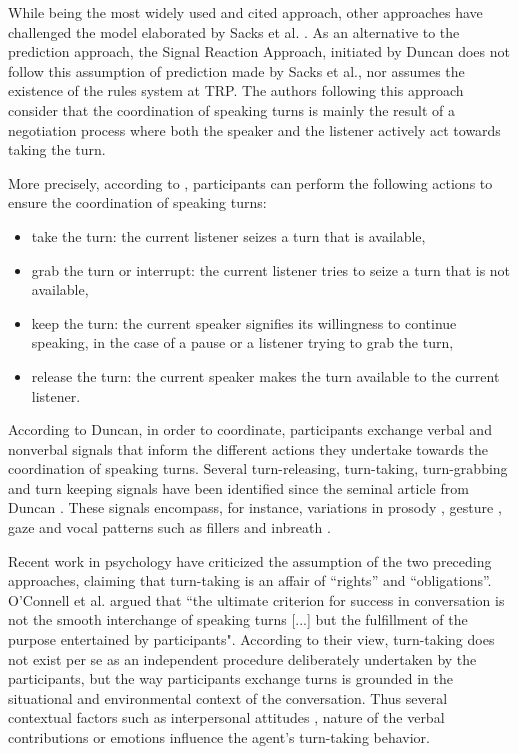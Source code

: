 While being the most widely used and cited approach, other approaches have challenged the model elaborated by Sacks et al. \citep{sacks_simplest_1974}.
As an alternative to the prediction approach, the Signal Reaction Approach, initiated by Duncan \citep{duncan_signals_1972} does not follow this assumption of prediction made by Sacks et al., nor assumes the existence of the rules system at TRP. 
The authors following this approach consider that the coordination of speaking turns is mainly the result of a negotiation process where both the speaker and the listener actively act towards taking the turn.

More precisely, according to \citep{bunt_dimensions_2006}, participants can perform the following actions to ensure the coordination of speaking turns: 
\begin{itemize}
\item take the turn: the current listener seizes a turn that is available,
\item grab the turn or interrupt: the current listener tries to seize a turn that is not available,
\item keep the turn: the current speaker signifies its willingness to continue speaking, in the case of a pause or a listener trying to grab the turn,
\item release the turn: the current speaker makes the turn available to the current listener.
\end{itemize}

According to Duncan, in order to coordinate, participants exchange verbal and nonverbal signals that inform the different actions they undertake towards the coordination of speaking turns. 
Several turn-releasing, turn-taking, turn-grabbing and turn keeping signals have been identified since the seminal article from Duncan \citep{duncan_signals_1972}. These signals encompass, for instance, variations in prosody \citep{duncan_signals_1972,gravano_turn-taking_2011,hjalmarsson_additive_2011}, gesture \citep{duncan_signals_1972,mondada_multimodal_2007}, gaze \citep{kendon_functions_1967,novick_coordinating_1996,oertel_gaze_2013} and vocal patterns 
such as fillers \citep{benus_pragmatic_2011} and inbreath \citep{torreira_breathing_2015}.  

Recent work in psychology have criticized
the assumption of the two preceding approaches, claiming that turn-taking is an affair of ``rights'' and ``obligations''. O'Connell et al.\citep{oconnell_turn-taking_1990} argued that ``the ultimate criterion for success in conversation is not the smooth interchange of speaking
turns [...] but the fulfillment of the purpose entertained
by participants". According to their view, turn-taking
does not exist per se as an independent procedure deliberately
undertaken by the participants, but the way
participants exchange turns is grounded in the situational
and environmental context of the conversation.
Thus several contextual factors such as interpersonal attitudes \citep{ter_maat_how_2010}, nature of the verbal contributions \citep{clark_using_1996,cafaro_effects_2016} or emotions \citep{goldberg_interrupting_1990} influence the agent's turn-taking behavior. 

